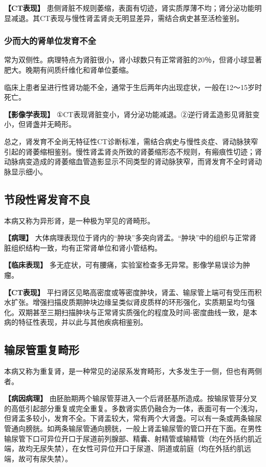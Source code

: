 \textbf{【CT表现】}
患侧肾脏不规则萎缩，表面有切迹，肾实质厚薄不均；肾分泌功能明显减退。其CT表现与慢性肾盂肾炎无明显差异，需结合病史甚至活检鉴别。

\subsubsection{少而大的肾单位发育不全}

常为双侧性。病理特点为肾脏很小，肾小球数只有正常肾脏的20％，但肾小球显著肥大。晚期有间质纤维化和肾单位萎缩。

临床上患者呈进行性肾功能不全，通常于生后两年内出现症状，一般在12～15岁时死亡。

\textbf{【影像学表现】}
①CT表现肾脏变小，肾分泌功能减退。②逆行肾盂造影见肾脏变小，但肾盏并无畸形。

总之，肾发育不全尚无特征性CT诊断标准，需结合病史与慢性炎症、肾动脉狭窄引起的肾萎缩相鉴别。慢性肾盂肾炎所致的肾萎缩形态不规则，有瘢痕性切迹；肾动脉病变造成的肾萎缩血管造影显示不同类型的肾动脉狭窄，而肾发育不全时肾动脉显示细小。

\subsection{节段性肾发育不良}

本病又称为异形肾，是一种极为罕见的肾畸形。

\textbf{【病理】}
大体病理表现位于肾内的“肿块”多突向肾盂。“肿块”中的组织与正常肾脏组织结构一致，均有正常肾单位和肾小管结构。

\textbf{【临床表现】}
多无症状，可有腰痛，实验室检查多无异常。影像学易误诊为肿瘤。

\textbf{【CT表现】}
平扫肾区见略高密度或等密度肿块，肾盂、输尿管上端可有受压而积水扩张。增强扫描皮质期肿块边缘呈类似肾皮质样的环形强化，实质期呈均匀强化。双期甚至三期扫描肿块与正常肾实质强化的程度及时间-密度曲线一致，是本病的特征性表现，并以此与其他疾病相鉴别。

\subsection{输尿管重复畸形}

本病又称为重复肾，是一种常见的泌尿系发育畸形，大多发生于一侧，但也有两侧者。

\textbf{【病因病理】}
由胚胎期两个输尿管芽进入一个后肾胚基所造成。按输尿管芽分叉的高低引起部分重复或完全重复。多数肾实质仍融合为一体，表面可有一个浅沟，但肾盂多较小，发育不全。下肾盂较大，常有两个大肾盏。可以有一条或两条输尿管通向膀胱。如两条输尿管通向膀胱，一般上肾盂输尿管的管口开在下面。在男性输尿管下口可异位开口于尿道前列腺部、精囊、射精管或输精管（均在外括约肌近端，故均无尿失禁），在女性可异位开口于尿道、阴道或前庭（均在外括约肌远端，故可有尿失禁）。

